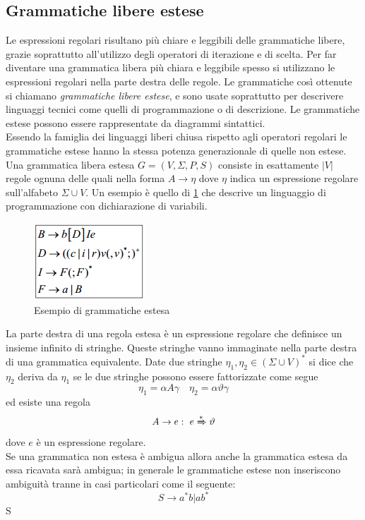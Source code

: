 \subsection{Grammatiche libere estese}
Le espressioni regolari risultano più chiare e leggibili delle grammatiche libere, grazie soprattutto all'utilizzo degli operatori di iterazione e di scelta. Per far diventare una grammatica libera più chiara e leggibile spesso si utilizzano le espressioni regolari nella parte destra delle regole. Le grammatiche così ottenute si chiamano \emph{grammatiche libere estese}, e sono usate soprattutto per descrivere linguaggi tecnici come quelli di programmazione o di descrizione.
Le grammatiche estese possono essere rappresentate da diagrammi sintattici.\\
Essendo la famiglia dei linguaggi liberi chiusa rispetto agli operatori regolari le grammatiche estese hanno la stessa potenza generazionale di quelle non estese.\\
Una grammatica libera estesa $ G = (V, \Sigma, P, S) $ consiste in esattamente $ |V| $ regole ognuna delle quali nella forma $A\rightarrow \eta$ dove $ \eta $ indica un espressione regolare sull'alfabeto $ \Sigma\cup V $. Un esempio è quello di \figurename \ref{fig:algo} che descrive un linguaggio di programmazione con dichiarazione di variabili.\\
\begin{figure}
	\centering
	\includegraphics[width=0.3\linewidth]{img/algo.png}
	\caption{Esempio di grammatiche estesa}\label{fig:algo}
\end{figure}
La parte destra di una regola estesa è un espressione regolare che definisce un insieme infinito di stringhe. Queste stringhe vanno immaginate nella parte destra di una grammatica equivalente.
Date due stringhe $ \eta_1, \eta_2 \in (\Sigma\cup V)^* $ si dice che $ \eta_2 $ deriva da $ \eta_1 $ se le due stringhe possono essere fattorizzate come segue
$$\eta_1=\alpha A\gamma \quad \eta_2=\alpha\vartheta\gamma$$
ed esiste una regola
$$A\rightarrow e : \ e \xRightarrow{*}\vartheta$$
dove $ e $ è un espressione regolare.\\
Se una grammatica non estesa è ambigua allora anche la grammatica estesa da essa ricavata sarà ambigua; in generale le grammatiche estese non inseriscono ambiguità tranne in casi particolari come il seguente:
$$S\rightarrow a^*b|ab^*$$S